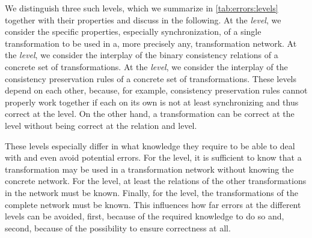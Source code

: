 We distinguish three such levels, which we summarize in \autoref{tab:errors:levels} together with their properties and discuss in the following.
%
At the \emph{\leveltransformation level}, we consider the specific properties, especially synchronization, of a single transformation to be used in a, more precisely any, transformation network.
At the \emph{\levelnetworkrelation level}, we consider the interplay of the binary consistency relations of a concrete set of transformations.
At the \emph{\levelnetworkrule level}, we consider the interplay of the consistency preservation rules of a concrete set of transformations.
These levels depend on each other, because, for example, consistency preservation rules cannot properly work together if each on its own is not at least synchronizing and thus correct at the \leveltransformation level.
On the other hand, a transformation can be correct at the \leveltransformation level without being correct at the relation and \levelnetworkrule level.

These levels especially differ in what knowledge they require to be able to deal with and even avoid potential errors.
For the \leveltransformation level, it is sufficient to know that a transformation may be used in a transformation network without knowing the concrete network.
For the \levelnetworkrelation level, at least the relations of the other transformations in the network must be known.
Finally, for the \levelnetworkrule level, the transformations of the complete network must be known.
This influences how far errors at the different levels can be avoided, first, because of the required knowledge to do so and, second, because of the possibility to ensure correctness at all.



